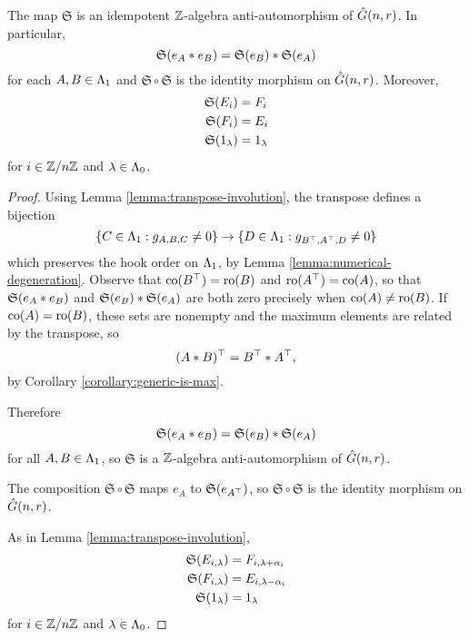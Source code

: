 \documentclass[a4paper, 11pt, twoside]{report}
\begin{document}
\begin{lemma}\label{lemma:transpose-involution-generic}
The map $\mathfrak{S}$ is an idempotent $\mathbb{Z}$-algebra anti-automorphism of $\hat{G}(n,r)$. In particular,
\begin{equation*}
\mathfrak{S}{(e_A\ast e_B)} = \mathfrak{S}{(e_B)}\ast \mathfrak{S}{(e_A)}
\end{equation*}
for each $A,B\in\Lambda_1{}$ and $\mathfrak{S}\circ \mathfrak{S}$ is the identity morphism on $\hat{G}(n,r)$. Moreover,
\begin{align*}
\mathfrak{S}{(E_i)} &= F_i\\
\mathfrak{S}{(F_i)} &= E_i\\
\mathfrak{S}{(1_\lambda)} &= 1_\lambda
\end{align*}
for $i\in\mathbb{Z}/{n \mathbb{Z}}$ and $\lambda\in\Lambda_0{}$.
\end{lemma}

\begin{proof}
Using Lemma \ref{lemma:transpose-involution}, the transpose defines a bijection
\begin{equation*}
\{C\in\Lambda_1{}:g_{A,B,C}\neq 0\}\to\{D\in\Lambda_1{}:g_{B^\top,A^\top,D}\neq 0\}
\end{equation*}
which preserves the hook order on $\Lambda_1{}$, by Lemma \ref{lemma:numerical-degeneration}. Observe that $\operatorname{co}(B^\top)=\operatorname{ro}(B)$ and $\operatorname{ro}(A^\top)=\operatorname{co}(A)$, so that $\mathfrak{S}{(e_A\ast e_B)}$ and $\mathfrak{S}{(e_B)}\ast\mathfrak{S}{(e_A)}$ are both zero precisely when $\operatorname{co}(A)\neq\operatorname{ro}(B)$. If $\operatorname{co}(A)=\operatorname{ro}(B)$, these sets are nonempty and the maximum elements are related by the transpose, so
\begin{equation*}
(A\ast B)^\top = B^\top \ast A^\top,
\end{equation*}
by Corollary \ref{corollary:generic-is-max}.

Therefore
\begin{equation*}
\mathfrak{S}{(e_A\ast e_B)} = \mathfrak{S}{(e_B)}\ast\mathfrak{S}{(e_A)}
\end{equation*}
for all $A,B\in\Lambda_1{}$, so $\mathfrak{S}$ is a $\mathbb{Z}$-algebra anti-automorphism of $\hat{G}(n,r)$.

The composition $\mathfrak{S}\circ \mathfrak{S}$ maps $e_A$ to $\mathfrak{S}{(e_{A^\top})}$, so $\mathfrak{S}\circ \mathfrak{S}$ is the identity morphism on $\hat{G}(n,r)$.

As in Lemma \ref{lemma:transpose-involution},
\begin{align*}
\mathfrak{S}{(E_{i,\lambda})} &= F_{i,\lambda+\alpha_i}\\
\mathfrak{S}{(F_{i,\lambda})} &= E_{i,\lambda-\alpha_i}\\
\mathfrak{S}{(1_\lambda)} &= 1_\lambda
\end{align*}
for $i\in\mathbb{Z}/{n \mathbb{Z}}$ and $\lambda\in\Lambda_0{}$.
\end{proof}
\end{document}
